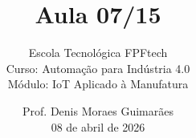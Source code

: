 \title{Aula 07/15}

\subtitle{
\vspace{1.0cm}
Escola Tecnológica FPFtech\\
\vspace{0.5cm}
Curso: Automação para Indústria 4.0\\
\vspace{0.5cm}
Módulo: IoT Aplicado à Manufatura
\vspace{1.0cm}
}

\author{
Prof. Denis Moraes Guimarães\\
\small 08 de abril de 2026
}

\date{}